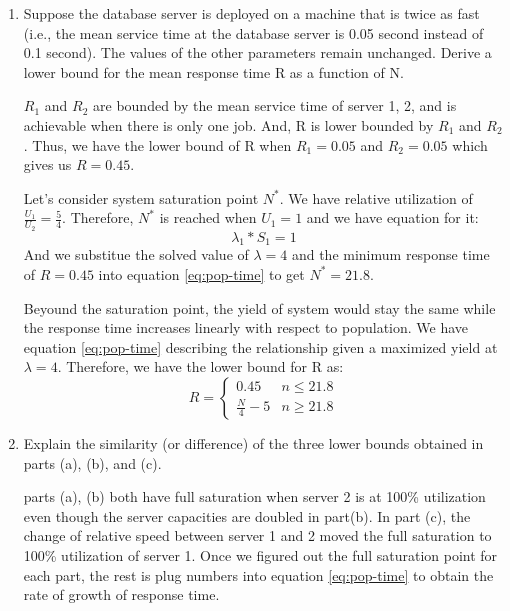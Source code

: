 \documentclass[12pt]{article}
\begin{document}
\begin{enumerate}
\begin{enumerate}
\item{} Suppose the database server is deployed on a machine that is twice as fast (i.e., the mean service time at the database server is 0.05 second instead of 0.1 second). The values of the other parameters remain unchanged. Derive a lower bound for the mean response time R as a function of N.

$R_1$ and $R_2$ are bounded by the mean service time of server 1, 2, and is achievable when there is only one job. And, R is lower bounded by $R_1$ and $R_2$. Thus, we have the lower bound of R when $R_1 = 0.05$ and $R_2 = 0.05$ which gives us $R = 0.45$.

Let's consider system saturation point $N^*$. We have relative utilization of $\frac{U_1}{U_2} = \frac{5}{4}$. Therefore, $N^*$ is reached when $U_1 = 1$ and we have equation for it:
\begin{equation}
\lambda_1 * S_1 = 1
\end{equation}
And we substitue the solved value of $\lambda = 4$ and the minimum response time of $R = 0.45$ into equation \ref{eq:pop-time} to get  $N^* = 21.8$.

Beyound the saturation point, the yield of system would stay the same while the response time increases linearly with respect to population. We have equation \ref{eq:pop-time} describing the relationship given a maximized yield at $\lambda = 4$. Therefore, we have the lower bound for R as:
\begin{equation*}
R = \begin{cases}
               0.45                                     & n \le 21.8\\
               \frac{N}{4} - 5                      & n \ge 21.8
           \end{cases}
\end{equation*}

\item{} Explain the similarity (or difference) of the three lower bounds obtained in parts (a), (b), and (c).

parts (a), (b) both have full saturation when server 2 is at 100\% utilization even though the server capacities are doubled in part(b). In part (c), the change of relative speed between server 1 and 2 moved the full saturation to 100\% utilization of server 1. Once we figured out the full saturation point for each part, the rest is plug numbers into equation \ref{eq:pop-time} to obtain the rate of growth of response time.
\end{enumerate}

\end{enumerate}
\end{document}

